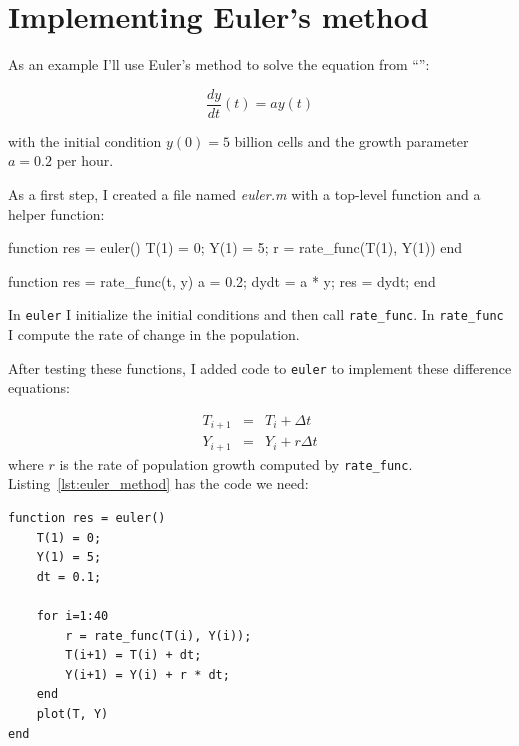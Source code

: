 

\section{Implementing Euler's method}

As an example I'll use Euler's method to solve the equation from ``'':

\[ \frac{dy}{dt}(t) = a y(t) \]

with the initial condition $y(0) = 5$ billion cells and
the growth parameter $a = 0.2$ per hour. 


As a first step, I created a file named {\em euler.m} with a top-level function and a helper function:

\begin{code}
function res = euler()
    T(1) = 0;
    Y(1) = 5;
    r = rate_func(T(1), Y(1))
end

function res = rate_func(t, y)
   a = 0.2;
   dydt = a * y;
   res = dydt;
end
\end{code}

In {\tt euler} I initialize the initial conditions and then call \verb"rate_func".  In \verb"rate_func" I compute the rate of change in the population.


After testing these functions, I added code to {\tt euler} to implement these difference equations:

\begin{eqnarray}
T_{i+1} &=& T_i + \Delta t             \\
Y_{i+1} &=& Y_i + r \Delta t          
\end{eqnarray}
%
where $r$ is the rate of population growth computed by \verb"rate_func".
Listing~\ref{lst:euler_method} has the code we need:

\begin{lstlisting}[caption={A function implementing Euler's method}, label={lst:euler_method}]
function res = euler()
    T(1) = 0;
    Y(1) = 5;
    dt = 0.1;
    
    for i=1:40
        r = rate_func(T(i), Y(i));
        T(i+1) = T(i) + dt;
        Y(i+1) = Y(i) + r * dt;
    end
    plot(T, Y)
end
\end{lstlisting}


